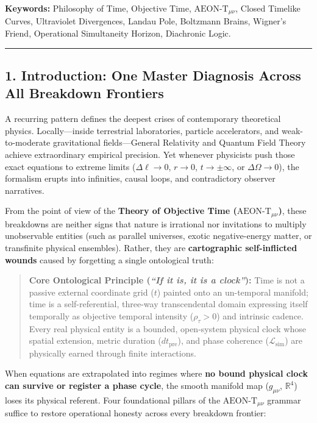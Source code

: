 \documentclass[
]{article}
\begin{document}
\textbf{Keywords:} Philosophy of Time, Objective Time,
\(\text{AEON-T}_{\mu\nu}\), Closed Timelike Curves, Ultraviolet
Divergences, Landau Pole, Boltzmann Brains, Wigner's Friend, Operational
Simultaneity Horizon, Diachronic Logic.

\begin{center}\rule{0.5\linewidth}{0.5pt}\end{center}

\subsection{1. Introduction: One Master Diagnosis Across All Breakdown
Frontiers}\label{introduction-one-master-diagnosis-across-all-breakdown-frontiers}

A recurring pattern defines the deepest crises of contemporary
theoretical physics. Locally---inside terrestrial laboratories, particle
accelerators, and weak-to-moderate gravitational fields---General
Relativity and Quantum Field Theory achieve extraordinary empirical
precision. Yet whenever physicists push those exact equations to extreme
limits (\(\Delta\ell \to 0\), \(r \to 0\), \(t \to \pm\infty\), or
\(\Delta\Omega \to 0\)), the formalism erupts into infinities, causal
loops, and contradictory observer narratives.

From the point of view of the \textbf{Theory of Objective Time
(\(\text{AEON-T}_{\mu\nu}\))}, these breakdowns are neither signs that
nature is irrational nor invitations to multiply unobservable entities
(such as parallel universes, exotic negative-energy matter, or
transfinite physical ensembles). Rather, they are \textbf{cartographic
self-inflicted wounds} caused by forgetting a single ontological truth:

\begin{quote}
\textbf{Core Ontological Principle (\emph{``If it is, it is a
clock''}):} Time is not a passive external coordinate grid (\(t\))
painted onto an un-temporal manifold; time is a self-referential,
three-way transcendental domain expressing itself temporally as
objective temporal intensity (\(\rho_\tau > 0\)) and intrinsic cadence.
Every real physical entity is a bounded, open-system physical clock
whose spatial extension, metric duration (\(dt_{\mathrm{pre}}\)), and
phase coherence (\(\mathcal{L}_{\mathrm{sim}}\)) are physically earned
through finite interactions.
\end{quote}

When equations are extrapolated into regimes where \textbf{no bound
physical clock can survive or register a phase cycle}, the smooth
manifold map (\(g_{\mu\nu}\), \(\mathbb{R}^4\)) loses its physical
referent. Four foundational pillars of the \(\text{AEON-T}_{\mu\nu}\)
grammar suffice to restore operational honesty across every breakdown
frontier:
\end{document}
